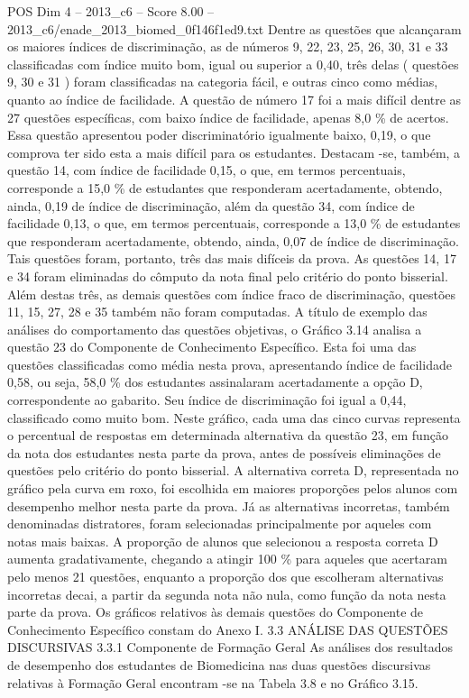 \begin{textsample}{POS Dim 4 – 2013\_c6 – Score 8.00 – 2013\_c6/enade\_2013\_biomed\_0f146f1ed9.txt}
Dentre as questões que alcançaram os maiores índices de discriminação, as de números 9, 22, 23, 25, 26, 30, 31 e 33 classificadas com índice muito bom, igual ou superior a 0,40, três delas ( questões 9, 30 e 31 ) foram classificadas na categoria fácil, e outras cinco como médias, quanto ao índice de facilidade.
A questão de número 17 foi a mais difícil dentre as 27 questões específicas, com baixo índice de facilidade, apenas 8,0 \% de acertos.
Essa questão apresentou poder discriminatório igualmente baixo, 0,19, o que comprova ter sido esta a mais difícil para os estudantes.
Destacam -se, também, a questão 14, com índice de facilidade 0,15, o que, em termos percentuais, corresponde a 15,0 \% de estudantes que responderam acertadamente, obtendo, ainda, 0,19 de índice de discriminação, além da questão 34, com índice de facilidade 0,13, o que, em termos percentuais, corresponde a 13,0 \% de estudantes que responderam acertadamente, obtendo, ainda, 0,07 de índice de discriminação.
Tais questões foram, portanto, três das mais difíceis da prova.
As questões 14, 17 e 34 foram eliminadas do cômputo da nota final pelo critério do ponto bisserial.
Além destas três, as demais questões com índice fraco de discriminação, questões 11, 15, 27, 28 e 35 também não foram computadas.
A título de exemplo das análises do comportamento das questões objetivas, o Gráfico 3.14 analisa a questão 23 do Componente de Conhecimento Específico.
Esta foi uma das questões classificadas como média nesta prova, apresentando índice de facilidade 0,58, ou seja, 58,0 \% dos estudantes assinalaram acertadamente a opção D, correspondente ao gabarito.
Seu índice de discriminação foi igual a 0,44, classificado como muito bom.
Neste gráfico, cada uma das cinco curvas representa o percentual de respostas em determinada alternativa da questão 23, em função da nota dos estudantes nesta parte da prova, antes de possíveis eliminações de questões pelo critério do ponto bisserial.
A alternativa correta D, representada no gráfico pela curva em roxo, foi escolhida em maiores proporções pelos alunos com desempenho melhor nesta parte da prova.
Já as alternativas incorretas, também denominadas distratores, foram selecionadas principalmente por aqueles com notas mais baixas.
A proporção de alunos que selecionou a resposta correta D aumenta gradativamente, chegando a atingir 100 \% para aqueles que acertaram pelo menos 21 questões, enquanto a proporção dos que escolheram alternativas incorretas decai, a partir da segunda nota não nula, como função da nota nesta parte da prova.
Os gráficos relativos às demais questões do Componente de Conhecimento Específico constam do Anexo I. 3.3 ANÁLISE DAS QUESTÕES DISCURSIVAS 3.3.1 Componente de Formação Geral As análises dos resultados de desempenho dos estudantes de Biomedicina nas duas questões discursivas relativas à Formação Geral encontram -se na Tabela 3.8 e no Gráfico 3.15.

\end{textsample}
